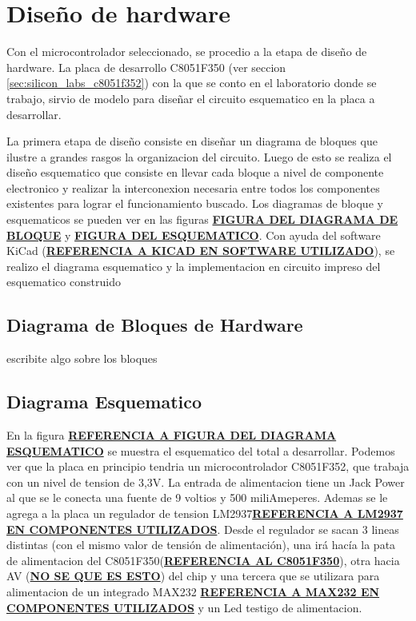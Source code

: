 \section{Dise\~no de hardware} %
\label{sec:diseno_de_hardware}


Con el microcontrolador seleccionado, se procedio a la etapa de dise\~no de hardware. La placa de desarrollo C8051F350 (ver seccion \ref{sec:silicon_labs_c8051f352}) con la que se conto en el laboratorio donde se trabajo, sirvio de modelo para dise\~nar el circuito esquematico en la placa a desarrollar.

La primera etapa de dise\~no consiste en dise\~nar un diagrama de bloques que ilustre a grandes rasgos la organizacion del circuito. Luego de esto se realiza el dise\~no esquematico que consiste en llevar cada bloque a nivel de componente electronico y realizar la interconexion necesaria entre todos los componentes existentes para lograr el funcionamiento buscado. Los diagramas de bloque y esquematicos se pueden ver en las figuras \underline{\textbf{FIGURA DEL DIAGRAMA DE BLOQUE}} y \underline{\textbf{FIGURA DEL ESQUEMATICO}}. Con ayuda del software KiCad (\textbf{\underline{REFERENCIA A KICAD EN SOFTWARE UTILIZADO}}), se realizo el diagrama esquematico y la implementacion en circuito impreso del esquematico construido

\subsection{Diagrama de Bloques de Hardware} %
\label{sub:diagrama_de_bloques_de_hardware}

escribite algo sobre los bloques




\subsection{Diagrama Esquematico} %
\label{sub:diagrama_esquematico}

En la figura \textbf{\underline{REFERENCIA A FIGURA DEL DIAGRAMA ESQUEMATICO}} se muestra el esquematico del total a desarrollar. Podemos ver que la placa en principio tendria un microcontrolador C8051F352, que trabaja con un nivel de tension de 3,3V. La entrada de alimentacion tiene un Jack Power al que se le conecta una fuente de 9 voltios y 500 miliAmeperes. Ademas se le agrega a la placa un regulador de tension LM2937\textbf{\underline{REFERENCIA A LM2937 EN COMPONENTES UTILIZADOS}}. Desde el regulador se sacan 3 lineas distintas (con el mismo valor de tensi\'on de alimentaci\'on), una ir\'a hacía la pata de alimentacion del C8051F350(\textbf{\underline{REFERENCIA AL C8051F350}}), otra hacia AV (\textbf{\underline{NO SE QUE ES ESTO}}) del chip y una tercera que se utilizara para alimentacion de un integrado MAX232 \textbf{\underline{REFERENCIA A MAX232 EN COMPONENTES UTILIZADOS}} y un Led testigo de alimentacion.



